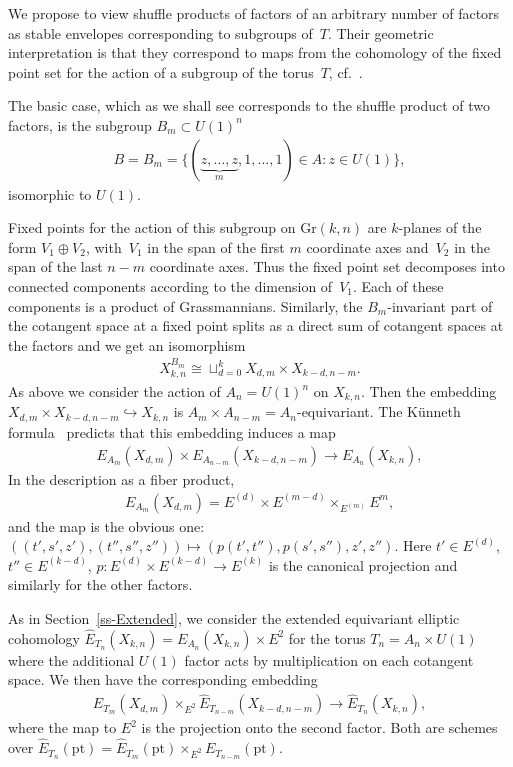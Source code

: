 \documentclass[10pt,a4paper]{amsart}
\numberwithin{equation}{section}
\begin{document}
We propose to view shuffle products of factors of an arbitrary number of factors as stable envelopes corresponding to subgroups of~$T$. Their geometric interpretation is that they correspond to maps from the cohomology of the fixed point set for the action of a subgroup of the torus~$T$, cf.~\cite[Section 3.6]{MO}.

The basic case, which as we shall see corresponds to the shuffle product of two factors, is the subgroup $B_m\subset U(1)^n$
\begin{gather*}
 B=B_m=\{(\underbrace {z,\dots,z}_m,1,\dots,1)\in A \colon z\in U(1)\},
\end{gather*}
isomorphic to $U(1)$.

Fixed points for the action of this subgroup on $\mathrm{Gr}(k,n)$ are $k$-planes of the form $V_1\oplus V_2$, with~$V_1$ in the span of the first $m$ coordinate axes and~$V_2$ in the span of the last $n-m$ coordinate axes. Thus the fixed point set decomposes into connected components according to the dimension of~$V_1$. Each of these components is a product of Grassmannians. Similarly, the $B_m$-invariant part of the cotangent space at a fixed point splits as a direct sum of cotangent spaces at the factors and we get an isomorphism
\begin{gather*}
 X_{k,n}^{B_m}\cong \sqcup_{d=0}^k X_{d,m}\times X_{k-d,n-m}.
\end{gather*}
As above we consider the action of $A_n=U(1)^n$ on $X_{k,n}$. Then the embedding $X_{d,m}\times X_{k-d,n-m}\hookrightarrow X_{k,n}$ is $A_m\times A_{n-m}= A_n$-equivariant. The K\"unneth formula~\cite{GKV} predicts that this embedding induces a map
\begin{gather}\label{e-Kunn}
 E_{A_m}(X_{d,m})\times E_{A_{n-m}}(X_{k-d,n-m})\to E_{A_n}(X_{k,n}),
\end{gather}
In the description as a fiber product,
\begin{gather*}
 E_{A_m}(X_{d,m})=E^{(d)}\times E^{(m-d)}\times_{E^{(m)}}E^m,
\end{gather*}
and the map is the obvious one: $((t',s',z'),(t'',s'',z''))\mapsto (p(t',t''),p(s',s''),z',z'')$. Here $t'\in E^{(d)}$, $t''\in E^{(k-d)}$, $p\colon E^{(d)}\times E^{(k-d)}\to E^{(k)}$ is the canonical projection and similarly for the other factors.

As in Section~\ref{ss-Extended}, we consider the extended equivariant elliptic cohomology $\hat E_{T_n}(X_{k,n})=E_{A_n}(X_{k,n})\times E^2$ for the torus $T_n=A_n\times U(1)$ where the additional $U(1)$ factor acts by multiplication on each cotangent space. We then have the corresponding embedding
\begin{gather}\label{e-embedding}
 \hat E_{T_m}(X_{d,m})\times_{E^2}\hat E_{T_{n-m}}(X_{k-d,n-m})\to \hat E_{T_n}(X_{k,n}),
\end{gather}
where the map to $E^2$ is the projection onto the second factor. Both are schemes over $\hat E_{T_n}(\mathrm{pt})=\hat E_{T_m}(\mathrm{pt})\times_{E^2}E_{T_{n-m}}(\mathrm{pt})$.
\end{document}
